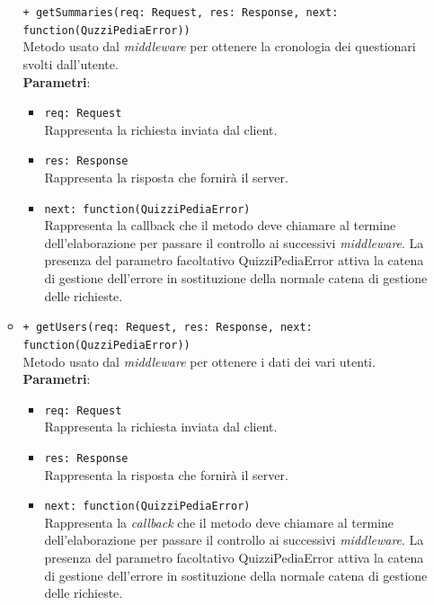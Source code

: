\begin{itemize}
\begin{itemize}
		  \texttt{+ getSummaries(req: Request, res: Response, next: function(QuzziPediaError))} \\
		Metodo usato dal \textit{middleware} per ottenere la cronologia dei questionari svolti dall'utente. \\
		\textbf{Parametri}:
		 \begin{itemize}
		  \item
			\texttt{req: Request} \\
			Rappresenta la richiesta inviata dal client.
		  \item
			\texttt{res: Response} \\
			Rappresenta la risposta che fornirà il server.
		  \item
		    \texttt{next: function(QuizziPediaError)} \\
			Rappresenta la callback che il metodo deve chiamare al termine dell'elaborazione per passare il controllo ai successivi \textit{middleware}. La presenza del parametro facoltativo QuizziPediaError attiva la catena di gestione dell'errore in sostituzione della normale catena di gestione delle richieste.
		 \end{itemize}
		  \item
		 	 \texttt{+ getUsers(req: Request, res: Response, next: function(QuzziPediaError))} \\
		Metodo usato dal \textit{middleware} per ottenere i dati dei vari utenti. \\
		\textbf{Parametri}:
		 \begin{itemize}
		  \item
			\texttt{req: Request} \\
			Rappresenta la richiesta inviata dal client.
		  \item
			\texttt{res: Response} \\
			Rappresenta la risposta che fornirà il server.
		  \item
		    \texttt{next: function(QuizziPediaError)} \\
			Rappresenta la \textit{callback} che il metodo deve chiamare al termine dell'elaborazione per passare il controllo ai successivi \textit{middleware}. La presenza del parametro facoltativo QuizziPediaError attiva la catena di gestione dell'errore in sostituzione della normale catena di gestione delle richieste.
		 \end{itemize}
	\end{itemize}	 
\end{itemize}
